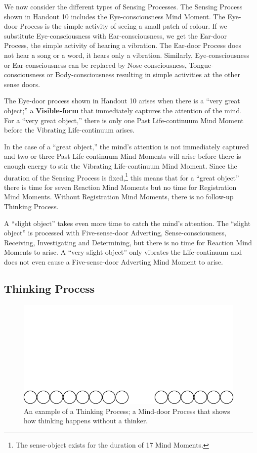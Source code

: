 We now consider the different types of Sensing Processes. The Sensing Process shown in Handout 10 includes the Eye-consciousness Mind Moment. The Eye-door Process is the simple activity of seeing a small patch of colour. If we substitute Eye-consciousness with Ear-consciousness, we get the Ear-door Process, the simple activity of hearing a vibration. The Ear-door Process does not hear a song or a word, it hears only a vibration. Similarly, Eye-consciousness or Ear-consciousness can be replaced by Nose-consciousness, Tongue-consciousness or Body-consciousness resulting in simple activities at the other sense doors.

The Eye-door process shown in Handout 10 arises when there is a “very great object;” a \textbf{Visible-form} that immediately captures the attention of the mind. For a “very great object,” there is only one Past Life-continuum Mind Moment before the Vibrating Life-continuum arises. 

In the case of a “great object,” the mind’s attention is not immediately captured and two or three Past Life-continuum Mind Moments will arise before there is enough energy to stir the Vibrating Life-continuum Mind Moment. Since the duration of the Sensing Process is fixed,\footnote{The sense-object exists for the duration of 17 Mind Moments.} this means that for a “great object” there is time for seven Reaction Mind Moments but no time for Registration Mind Moments. Without Registration Mind Moments, there is no follow-up Thinking Process.

A “slight object” takes even more time to catch the mind’s attention. The “slight object” is processed with Five-sense-door Adverting, Sense-consciousness, Receiving, Investigating and Determining, but there is no time for Reaction Mind Moments to arise. A “very slight object” only vibrates the Life-continuum and does not even cause a Five-sense-door Adverting Mind Moment to arise.

\subsection*{Thinking Process}

\begin{figure}[h]
\centering
\includegraphics[width=0.8\linewidth]{./Diagrams/Process2}
\caption{An example of a Thinking Process; a Mind-door Process that shows how thinking happens without a thinker.}
\label{fig:Process2}
\end{figure}

